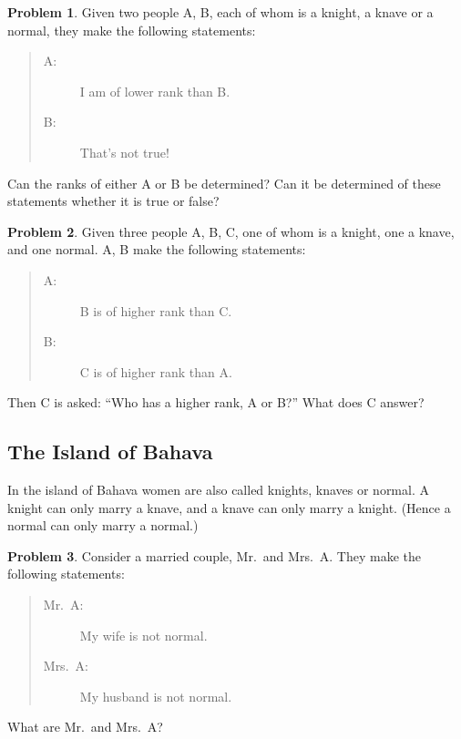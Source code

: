 \documentclass[11pt]{article}
\theoremstyle{definition}
\newtheorem{problem}{Problem}
\begin{document}
\begin{problem}
  Given two people A, B, each of whom is a knight, a knave or a normal, they make the following statements:
  \begin{quote}
    \begin{description}
    \item[A:] I am of lower rank than B.
    \item[B:] That's not true!
    \end{description}
  \end{quote}
  Can the ranks of either A or B be determined?  Can it be determined of these statements whether it is true or false?
\end{problem}

\begin{problem}
  Given three people A, B, C, one of whom is a knight, one a knave, and one normal.  A, B make the following statements:
  \begin{quote}
    \begin{description}
    \item[A:] B is of higher rank than C.
    \item[B:] C is of higher rank than A.
    \end{description}
  \end{quote}
  Then C is asked: ``Who has a higher rank, A or B?''  What does C answer?
\end{problem}

\subsection*{The Island of Bahava}

In the island of Bahava women are also called knights, knaves or normal.  A knight can only marry a knave, and a knave
can only marry a knight.  (Hence a normal can only marry a normal.)

\begin{problem}
  Consider a married couple, Mr.~and Mrs.~A.  They make the following statements:
  \begin{quote}
    \begin{description}
    \item[Mr.~A:] My wife is not normal.
    \item[Mrs.~A:] My husband is not normal.
    \end{description}
  \end{quote}
  What are Mr.~and Mrs.~A?
\end{problem}
\end{document}
